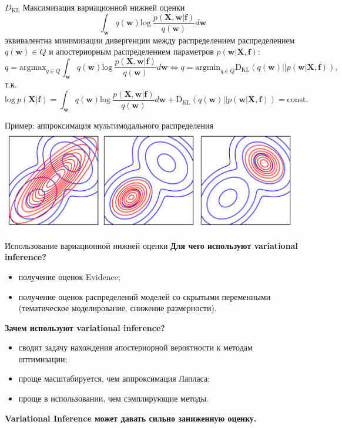 \documentclass[10pt,pdf,utf8,russian,aspectratio=169]{beamer}
\begin{document}
\begin{frame}{$D_\text{KL}$}
Максимизация вариационной нижней оценки $$\int_{\mathbf{w}} q(\mathbf{w})\text{log}~\frac{p(\mathbf{X},\mathbf{w}|\mathbf{f})}{q(\mathbf{w})}d\mathbf{w}$$   эквивалентна минимизации дивергенции между распределением распределением $q(\mathbf{w}) \in Q$ и апостериорным распределением параметров $p(\mathbf{w}|\mathbf{X}, \mathbf{f})$:
\[
q = \text{argmax}_{q \in Q}\int_{\mathbf{w}} q(\mathbf{w})\text{log}~\frac{p(\mathbf{X},\mathbf{w}|\mathbf{f})}{q(\mathbf{w})}d\mathbf{w} \Leftrightarrow 	
q = \text{argmin}_{q \in Q} \text{D}_\text{KL}  (q(\mathbf{w})||p(\mathbf{w}| \mathbf{X}, \mathbf{f})),
\]
т.к.
$$\text{log}~p(\mathbf{X}| \mathbf{f})  = \int_{\mathbf{w}} q(\mathbf{w})\text{log}~\frac{p(\mathbf{X},\mathbf{w}|\mathbf{f})}{q(\mathbf{w})}d\mathbf{w} + \text{D}_\text{KL}  (q(\mathbf{w})||p(\mathbf{w}| \mathbf{X}, \mathbf{f})) = \text{const}.$$

\end{frame}

\begin{frame}{Пример: аппроксимация мультимодального распределения}
\includegraphics[width=\textwidth]{bishop.png}
\end{frame}


\begin{frame}{Использование вариационной нижней оценки}
\textbf{Для чего используют variational inference?}
\begin{itemize}
\item получение оценок Evidence;
\item получение оценок распределений моделей со скрытыми переменными (тематическое моделирование, снижение размерности).
\end{itemize}

\textbf{Зачем используют variational inference?}
\begin{itemize}
\item сводит задачу нахождения апостериорной вероятности к методам оптимизации;
\item проще масштабируется, чем аппроксимация Лапласа;
\item проще в использовании, чем сэмплирующие методы.
\end{itemize}
\textbf{Variational Inference может давать сильно заниженную оценку.}
\end{frame}
\end{document}
